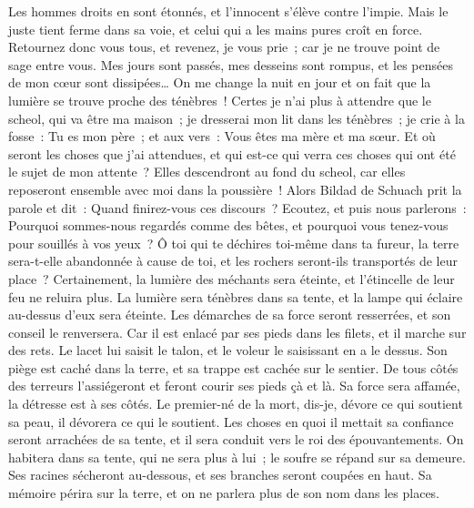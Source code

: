 \begin{multicols}{2}
Les hommes droits en sont étonnés, et l'innocent s'élève contre l'impie.
Mais le juste tient ferme dans sa voie, et celui qui a les mains pures croît en force. 
Retournez donc vous tous, et revenez, je vous prie~; car je ne trouve point de sage entre vous. 
Mes jours sont passés, mes desseins sont rompus, et les pensées de mon cœur sont dissipées… 
On me change la nuit en jour et on fait que la lumière se trouve proche des ténèbres~! 
Certes je n'ai plus à attendre que le scheol, qui va être ma maison~; je dresserai mon lit dans les ténèbres~;
je crie à la fosse~: Tu es mon père~; et aux vers~: Vous êtes ma mère et ma sœur. 
Et où seront les choses que j'ai attendues, et qui est-ce qui verra ces choses qui ont été le sujet de mon attente~?
Elles descendront au fond du scheol, car elles reposeront ensemble avec moi dans la poussière~! 
\VerseOne{}Alors Bildad de Schuach prit la parole et dit~:
Quand finirez-vous ces discours~? Ecoutez, et puis nous parlerons~:
Pourquoi sommes-nous regardés comme des bêtes, et pourquoi vous tenez-vous pour souillés à vos yeux~?
Ô toi qui te déchires toi-même dans ta fureur, la terre sera-t-elle abandonnée à cause de toi, et les rochers seront-ils transportés de leur place~? 
Certainement, la lumière des méchants sera éteinte, et l'étincelle de leur feu ne reluira plus.
La lumière sera ténèbres dans sa tente, et la lampe qui éclaire au-dessus d'eux sera éteinte.
Les démarches de sa force seront resserrées, et son conseil le renversera.
Car il est enlacé par ses pieds dans les filets, et il marche sur des rets.
Le lacet lui saisit le talon, et le voleur le saisissant en a le dessus. 
Son piège est caché dans la terre, et sa trappe est cachée sur le sentier. 
De tous côtés des terreurs l'assiégeront et feront courir ses pieds çà et là.
Sa force sera affamée, la détresse est à ses côtés.
Le premier-né de la mort, dis-je, dévore ce qui soutient sa peau, il dévorera ce qui le soutient. 
 Les choses en quoi il mettait sa confiance seront arrachées de sa tente, et il sera conduit vers le roi des épouvantements. 
On habitera dans sa tente, qui ne sera plus à lui~; le soufre se répand sur sa demeure. 
Ses racines sécheront au-dessous, et ses branches seront coupées en haut. 
Sa mémoire périra sur la terre, et on ne parlera plus de son nom dans les places.

\end{multicols}
